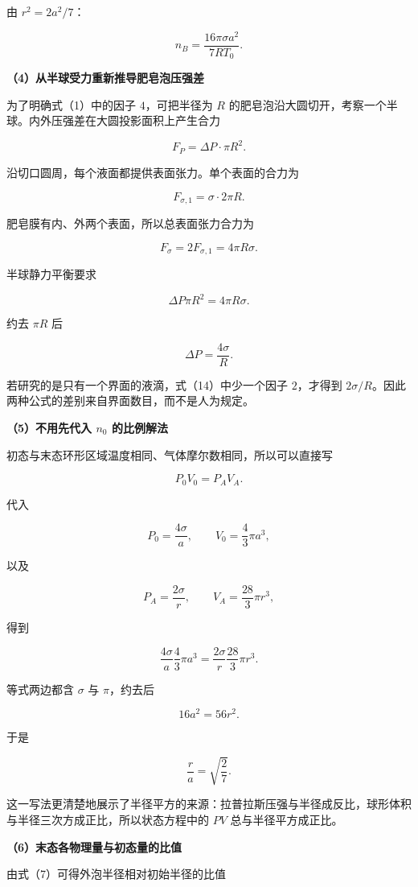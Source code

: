 \documentclass[12pt,a4paper,UTF8]{ctexart}
\begin{document}
由 \(r^2=2a^2/7\)：

\[
\boxed{
n_B
=\frac{16\pi\sigma a^2}{7RT_0}
}.
\tag{12}
\]

\textbf{（4）从半球受力重新推导肥皂泡压强差}

为了明确式（1）中的因子 \(4\)，可把半径为 \(R\)
的肥皂泡沿大圆切开，考察一个半球。内外压强差在大圆投影面积上产生合力

\[
F_P=\Delta P\cdot\pi R^2.
\tag{13}
\]

沿切口圆周，每个液面都提供表面张力。单个表面的合力为

\[
F_{\sigma,1}=\sigma\cdot2\pi R.
\]

肥皂膜有内、外两个表面，所以总表面张力合力为

\[
F_\sigma=2F_{\sigma,1}=4\pi R\sigma.
\tag{14}
\]

半球静力平衡要求

\[
\Delta P\pi R^2=4\pi R\sigma.
\]

约去 \(\pi R\) 后

\[
\Delta P=\frac{4\sigma}{R}.
\]

若研究的是只有一个界面的液滴，式（14）中少一个因子 \(2\)，才得到
\(2\sigma/R\)。因此两种公式的差别来自界面数目，而不是人为规定。

\textbf{（5）不用先代入 \(n_0\) 的比例解法}

初态与末态环形区域温度相同、气体摩尔数相同，所以可以直接写

\[
P_0V_0=P_AV_A.
\tag{15}
\]

代入

\[
P_0=\frac{4\sigma}{a},
\qquad
V_0=\frac43\pi a^3,
\]

以及

\[
P_A=\frac{2\sigma}{r},
\qquad
V_A=\frac{28}{3}\pi r^3,
\]

得到

\[
\frac{4\sigma}{a}\frac43\pi a^3
=\frac{2\sigma}{r}\frac{28}{3}\pi r^3.
\]

等式两边都含 \(\sigma\) 与 \(\pi\)，约去后

\[
16a^2=56r^2.
\]

于是

\[
\frac r a=\sqrt{\frac27}.
\tag{16}
\]

这一写法更清楚地展示了半径平方的来源：拉普拉斯压强与半径成反比，球形体积与半径三次方成正比，所以状态方程中的
\(PV\) 总与半径平方成正比。

\textbf{（6）末态各物理量与初态量的比值}

由式（7）可得外泡半径相对初始半径的比值
\end{document}

